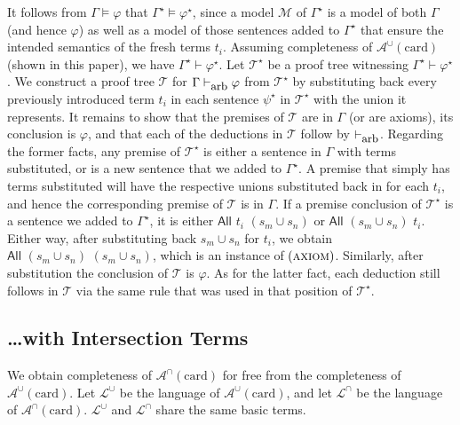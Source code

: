 \documentclass[letterpaper]{article}
\theoremstyle{definition}
\newcommand{\Model}{\mathcal{M}}
\newcommand{\proves}{\vdash}
\newcommand{\lang}{\mathcal{L}}
\newcommand{\Aunion}{\mathscr{A}^{\cup}}
\newcommand{\Ainter}{\mathscr{A}^{\cap}}
\newcommand{\proverule}{\textsc}
\newcommand{\axiom}{\proverule{axiom}}
\newcommand{\All}[2]{\mathsf{All}\,\,#1\,\,#2}
\newcommand{\AllNoArgs}{\mathsf{All}}
\newcommand{\AtleastNoArgs}{\mathsf{AtLeast}}
\newcommand{\card}{\mathrm{card}}
\newcommand{\provesarbitrary}{\proves_{\mbox{\small{arb}}}}
\begin{document}
It follows from $\Gamma \models \varphi$ that $\Gamma^\star \models \varphi^\star$, since a model $\Model$ of $\Gamma^\star$ is a model of both $\Gamma$ (and hence $\varphi$) as well as a model of those sentences added to $\Gamma^\star$ that ensure the intended semantics of the fresh terms $t_i$.  Assuming completeness of $\Aunion(\card)$ (shown in this paper), we have $\Gamma^\star \proves \varphi^\star$.  Let $\mathcal{T}^\star$ be a proof tree witnessing $\Gamma^\star \proves \varphi^\star$.  We construct a proof tree $\mathcal{T}$ for $\Gamma \provesarbitrary \varphi$ from $\mathcal{T}^\star$ by substituting back every previously introduced term $t_i$ in each sentence $\psi^\star$ in $\mathcal{T}^\star$ with the union it represents.  It remains to show that the premises of $\mathcal{T}$ are in $\Gamma$ (or are axioms), its conclusion is $\varphi$, and that each of the deductions in $\mathcal{T}$ follow by $\provesarbitrary$.  
Regarding the former facts, any premise of $\mathcal{T}^\star$ is either a sentence in $\Gamma$ with terms substituted, or is a new sentence that we added to $\Gamma^\star$.  A premise that simply has terms substituted will have the respective unions substituted back in for each $t_i$, and hence the corresponding premise of $\mathcal{T}$ is in $\Gamma$.  If a premise conclusion of $\mathcal{T}^\star$ is a sentence we added to $\Gamma^\star$, it is either $\All{t_i}{(s_m \cup s_n)}$ or $\All{(s_m \cup s_n)}{t_i}$.  Either way, after substituting back $s_m \cup s_n$ for $t_i$, we obtain $\All{(s_m \cup s_n)}{(s_m \cup s_n)}$, which is an instance of $(\axiom)$.  Similarly, after substitution the conclusion of $\mathcal{T}$ is $\varphi$.  As for the latter fact, each deduction still follows in $\mathcal{T}$ via the same rule that was used in that position of $\mathcal{T}^\star$.



\subsection{\ldots with Intersection Terms}

We obtain completeness of $\Ainter(\card)$ for free from the completeness of  $\Aunion(\card)$.
Let $\lang^\cup$ be the language 
of $\Aunion(\card)$, and
let $\lang^\cap$ be the language of $\Ainter(\card)$. 
$\lang^\cup$ and $\lang^\cap$ share the same basic terms.
\end{document}

